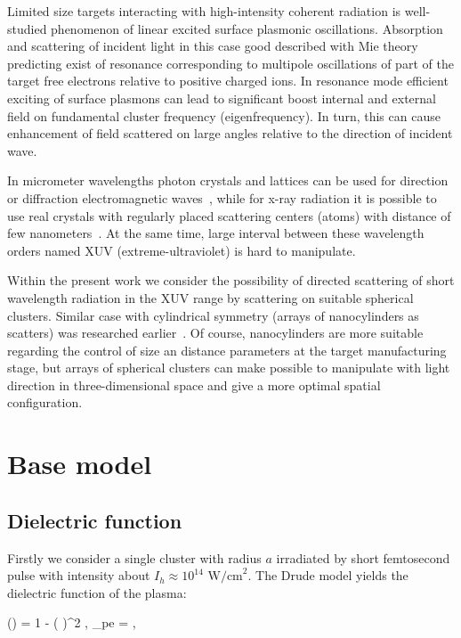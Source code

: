 \documentclass[conference]{IEEEtran}
\begin{document}
Limited size targets interacting with high-intensity coherent radiation is well-studied phenomenon of linear excited surface plasmonic oscillations. Absorption and scattering of incident light in this case good described with Mie theory predicting exist of resonance corresponding to multipole oscillations of part of the target free electrons relative to positive charged ions. In resonance mode efficient exciting of surface plasmons can lead to significant boost internal and external field on fundamental cluster frequency (eigenfrequency). In turn, this can cause enhancement of field scattered on large angles relative to the direction of incident wave.

In micrometer wavelengths photon crystals and lattices can be used for direction or diffraction electromagnetic waves~\cite{lin_zhang}, while for x-ray radiation it is possible to use real crystals with regularly placed scattering centers (atoms) with distance of few nanometers~\cite{batterman_cole}. At the same time, large interval between these wavelength orders named XUV (extreme-ultraviolet) is hard to manipulate.

Within the present work we consider the possibility of directed scattering of short wavelength radiation in the XUV range by scattering on suitable spherical clusters. Similar case with cylindrical symmetry (arrays of nanocylinders as scatters) was researched earlier~\cite{andreev_lecz}. Of course, nanocylinders are more suitable regarding the control of size an distance parameters at the target manufacturing stage, but arrays of spherical clusters can make possible to manipulate with light direction in three-dimensional space and give a more optimal spatial configuration.

\section{Base model}

\subsection{Dielectric function}

Firstly we consider a single cluster with radius $a$ irradiated by short femtosecond pulse with intensity about $I_{h} \approx 10^{14}$ $\textrm{W/cm}^2$. The Drude model yields the dielectric function of the plasma:

	\eq
		\varepsilon (\w) = 1 - \left(  \right)^2 , \qquad \w_{pe} = ,
		\label{eps_plasma}
	\qe
\end{document}
